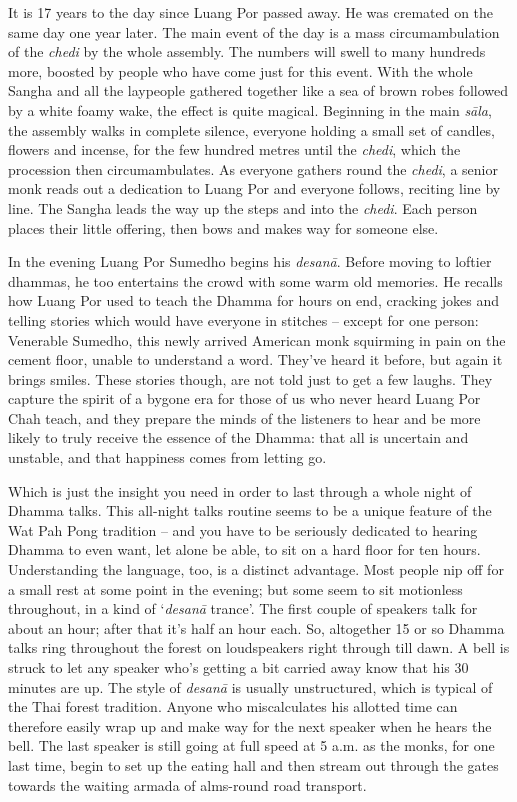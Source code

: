 It is 17 years to the day since Luang Por passed away. He was
cremated on the same day one year later. The main event of the day is a
mass circumambulation of the \emph{chedi} by the whole assembly. The
numbers will swell to many hundreds more, boosted by people who have
come just for this event. With the whole Sangha and all the laypeople
gathered together like a sea of brown robes followed by a white foamy
wake, the effect is quite magical. Beginning in the main \emph{sāla}, 
the assembly walks in complete silence, everyone holding a small set of
candles, flowers and incense, for the few hundred metres until the
\emph{chedi}, which the procession then circumambulates. As everyone
gathers round the \emph{chedi}, a senior monk reads out a dedication to
Luang Por and everyone follows, reciting line by line. The Sangha leads
the way up the steps and into the \emph{chedi}. Each person places their
little offering, then bows and makes way for someone else. 

In the evening Luang Por Sumedho begins his \emph{desanā}. Before moving
to loftier dhammas, he too entertains the crowd with some warm old
memories. He recalls how Luang Por used to teach the Dhamma for hours on
end, cracking jokes and telling stories which would have everyone in
stitches -- except for one person: Venerable Sumedho, this newly arrived
American monk squirming in pain on the cement floor, unable to
understand a word. They've heard it before, but again it brings smiles. 
These stories though, are not told just to get a few laughs. They
capture the spirit of a bygone era for those of us who never heard Luang
Por Chah teach, and they prepare the minds of the listeners to hear and
be more likely to truly receive the essence of the Dhamma: that all is
uncertain and unstable, and that happiness comes from letting go. 

Which is just the insight you need in order to last through a whole
night of Dhamma talks. This all-night talks routine seems to be a unique
feature of the Wat Pah Pong tradition -- and you have to be seriously
dedicated to hearing Dhamma to even want, let alone be able, to sit on a
hard floor for ten hours. Understanding the language, too, is a distinct
advantage. Most people nip off for a small rest at some point in the
evening; but some seem to sit motionless throughout, in a kind of
`\emph{desanā} trance'. The first couple of speakers talk for about an
hour; after that it's half an hour each. So, altogether 15 or so
Dhamma talks ring throughout the forest on loudspeakers right through
till dawn. A bell is struck to let any speaker who's getting a bit
carried away know that his 30 minutes are up. The style of \emph{desanā}
is usually unstructured, which is typical of the Thai forest tradition. 
Anyone who miscalculates his allotted time can therefore easily wrap up
and make way for the next speaker when he hears the bell. The last
speaker is still going at full speed at 5 a.m. as the monks, for one
last time, begin to set up the eating hall and then stream out through the gates
towards the waiting armada of alms-round road transport. 

